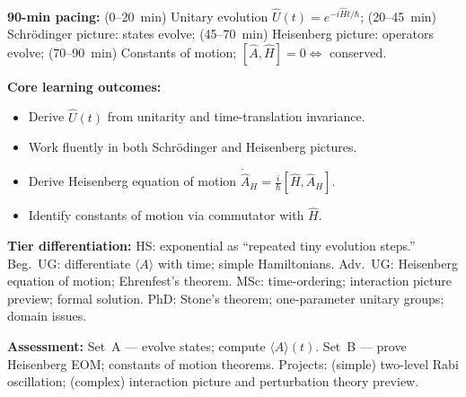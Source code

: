 \documentclass[11pt,a4paper]{article}
\begin{document}
\medskip
\begin{tcolorbox}[modulebox, title={Module~I.2 --- Lecture L08: Time Evolution \& Pictures of Quantum Mechanics}]
\textbf{90-min pacing:} (0--20~min) Unitary evolution $\hat{U}(t)=e^{-i\hat{H}t/\hbar}$;
(20--45~min) Schr\"odinger picture: states evolve;
(45--70~min) Heisenberg picture: operators evolve;
(70--90~min) Constants of motion; $[\hat{A},\hat{H}]=0\Leftrightarrow$ conserved.

\medskip\textbf{Core learning outcomes:}
\begin{itemize}[leftmargin=1.4em,topsep=2pt,itemsep=1pt]
  \item Derive $\hat{U}(t)$ from unitarity and time-translation invariance.
  \item Work fluently in both Schr\"odinger and Heisenberg pictures.
  \item Derive Heisenberg equation of motion $\dot{\hat{A}}_H=\tfrac{i}{\hbar}[\hat{H},\hat{A}_H]$.
  \item Identify constants of motion via commutator with $\hat{H}$.
\end{itemize}

\medskip\textbf{Tier differentiation:}
HS: exponential as ``repeated tiny evolution steps.''
Beg.\ UG: differentiate $\langle A\rangle$ with time; simple Hamiltonians.
Adv.\ UG: Heisenberg equation of motion; Ehrenfest's theorem.
MSc: time-ordering; interaction picture preview; formal solution.
PhD: Stone's theorem; one-parameter unitary groups; domain issues.

\medskip\textbf{Assessment:}
Set~A --- evolve states; compute $\langle A\rangle(t)$.
Set~B --- prove Heisenberg EOM; constants of motion theorems.
Projects: (simple) two-level Rabi oscillation; (complex) interaction picture and perturbation theory preview.
\end{tcolorbox}
\end{document}
